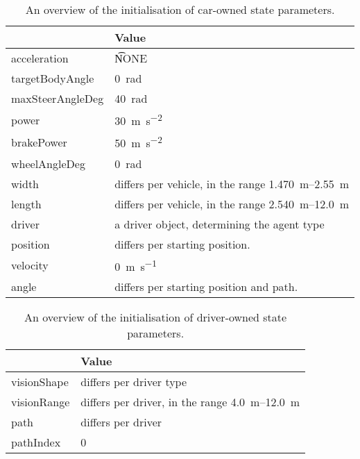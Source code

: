 \begin{table}
	\centering
	\begin{tabularx}{\textwidth}{>{\ttfamily}lX}
		\toprule
		\normalfont{Parameter}	& Value \\  
		\midrule
		acceleration 			
			& \t{NONE} \\ 
		targetBodyAngle 		
			& \SI[mode=text]{0}{\radian} \\ 
		maxSteerAngleDeg 		
			& \SI[mode=text]{40}{\radian} \\ 
		power 					
			& \SI[mode=text]{30}{\meter\per\square\second}\\ 
		brakePower 		
			& \SI{50}{\meter\per\square\second}\\
		wheelAngleDeg 			
			& \SI[mode=text]{0}{\radian} \\ 
		width 					
			& differs per vehicle, in the range \SIrange{1.470}{2.55}{\meter} \\ 
		length 					
			& differs per vehicle, in the range \SIrange{2.540}{12.0}{\meter} \\ 
		driver 					
			& a driver object, determining the agent type \\
		position 		
			& differs per starting position. \\
		velocity
			& \SI[mode=text]{0}{\meter\per\second}\\
		angle
			& differs per starting position and path. \\
		\bottomrule
	\end{tabularx}
	\caption{An overview of the initialisation of car-owned state parameters.}
	\label{tab:par:method:model:details:init:car:value}
\end{table} 

\begin{table}
	\centering
	\begin{tabularx}{\textwidth}{>{\ttfamily}lX}
		\toprule
		\normalfont{Parameter}	& Value \\  
		\midrule
		visionShape 			
			& differs per driver type \\
		visionRange 			
			& differs per driver, in the range \SIrange{4.0}{12.0}{\meter} \\
		path
			& differs per driver \\
		pathIndex
			& 0 \\
		\bottomrule
	\end{tabularx}
	\caption{An overview of the initialisation of driver-owned state parameters.}
	\label{tab:par:method:model:details:init:driver:value}
\end{table}



